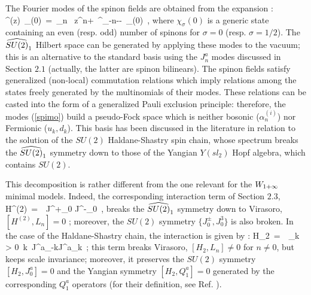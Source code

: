 The Fourier modes of the spinon fields are obtained from the
expansion \cite{bls}:
\beq
\Phi^{\alpha}(z)\ \chi_{\sigma}(0)\ =\ \sum_{n \in\Z}\ 
z^{n+\sigma}\ \Phi^{\alpha}_{-n-\sigma -}\
\chi_{\sigma}(0)\ ,
\label{spimo}
\eeq
where $\chi_{\sigma}(0)$ is a generic state containing an
even (resp. odd) number of spinons for $\sigma=0$ (resp.
$\sigma=1/2$). The $\su2$ Hilbert space can be generated by
applying these modes to the vacuum; this is an alternative 
to the standard basis using the $J^a_n$ modes discussed in
Section $2.1$ (actually, the latter are spinon bilinears).
The spinon fields satisfy generalized (non-local) commutation 
relations which imply relations among the states freely
generated by the multinomials of their modes. These relations
can be casted into the form of a generalized Pauli exclusion
principle: therefore, the modes (\ref{spimo}) build a 
pseudo-Fock space which is neither bosonic ($\alpha^{(i)}_n$)
nor Fermionic ($u_k, d_k$).
This basis has been discussed in the literature in relation 
to the solution of the $SU(2)$ Haldane-Shastry spin chain, whose
spectrum breaks the $\su2$ symmetry down to those of the 
Yangian $Y(sl_2)$ Hopf algebra, which contains $SU(2)$.

This decomposition is rather different from the one relevant for 
the $W_{1+\infty}\ $ minimal models. Indeed, the corresponding
interaction term of Section $2.3$,
\beq
H^{(2)}\ =\ \gamma\ J^+_0 J^-_0\ ,
\eeq
breaks the $\su2$ symmetry down to Virasoro, $[H^{(2)},L_n]=0$ ;
moreover, the $SU(2)$ symmetry $\{J^{\pm}_0,J^3_0\}$ is
also broken. 
In the case of the Haldane-Shastry chain, the interaction
is given by :
\beq
H_2\ =\ \lambda\ \sum_{k > 0}\ k\ J^a_{-k}J^a_k\ ;
\eeq
this term breaks Virasoro, $[H_2 ,L_n] \neq 0$ for $n \neq 0$,
but keeps scale invariance; moreover, it preserves the
$SU(2)$ symmetry $[H_2,J^a_0]=0$ and the Yangian symmetry
$[H_2,Q^a_1]=0$ generated by the corresponding $Q^a_1$ operators (for their
definition, see Ref. \cite{spinon}\cite{bls}).

